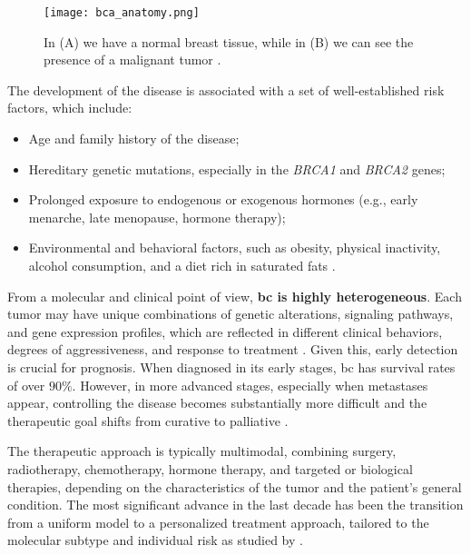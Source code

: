 \begin{figure}
  \centering
  \texttt{[image: bca\_anatomy.png]}
  \caption{In (A) we have a normal breast tissue, while in (B) we can see
    the presence of a malignant tumor \cite{bca_anatomy_figure_Muthu2020}.}
  \label{fig:breast_cancer_anatomy}
\end{figure}

The development of the disease is associated with a set of well-established
risk factors, which include:
\begin{itemize}
  \item Age and family history of the disease;
  \item Hereditary genetic mutations, especially in the \textit{BRCA1} and
        \textit{BRCA2} genes;
  \item Prolonged exposure to endogenous or exogenous hormones (e.g., early menarche,
        late menopause, hormone therapy);
  \item Environmental and behavioral factors, such as obesity, physical inactivity,
        alcohol consumption, and a diet rich in saturated fats
        \cite{BreastEpidemiology_Romanowicz2022,clinical_implication_bca_Adamo2015}.
\end{itemize}

From a molecular and clinical point of view, \textbf{\gls{bc} is highly
  heterogeneous}. Each tumor may have unique combinations of genetic alterations,
signaling pathways, and gene expression profiles, which are reflected in
different clinical behaviors, degrees of aggressiveness, and response to
treatment
\cite{origins_and_evolution_bca_Polyak2007,diff_bca_usa_Howlader2018}. Given
this, early detection is crucial for prognosis. When diagnosed in its early
stages, \gls{bc} has survival rates of over $90\%$. However, in more advanced
stages, especially when metastases appear, controlling the disease becomes
substantially more difficult and the therapeutic goal shifts from curative to
palliative \cite{updatedbca_Hong2022Breast,clinical_implication_bca_Adamo2015}.

The therapeutic approach is typically multimodal, combining surgery,
radiotherapy, chemotherapy, hormone therapy, and targeted or biological
therapies, depending on the characteristics of the tumor and the patient's
general condition. The most significant advance in the last decade has been the
transition from a uniform model to a personalized treatment approach, tailored
to the molecular subtype and individual risk as studied by
\textcite{BreastEpidemiology_Romanowicz2022}.

